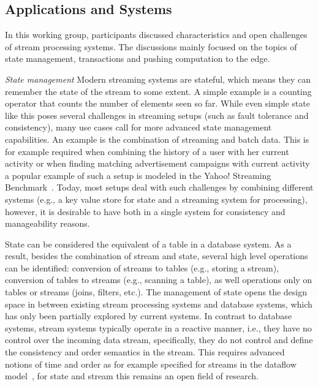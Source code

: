 \subsection{Applications and Systems}

In this working group, participants discussed characteristics and open
challenges of stream processing systems. The discussions mainly focused on
the topics of state management, transactions and pushing computation to the edge.

\emph{State management} Modern streaming systems are stateful, which means they can remember the state
of the stream to some extent. A simple example is a counting operator that
counts the number of elements seen so far. While even simple state like this
poses several challenges in streaming setups (such as fault tolerance and
consistency), many use cases call for more advanced state management
capabilities. An example is the combination of streaming and batch data. This
is for example required when combining the history of a user with her current
activity or when finding matching advertisement campaigns with current activity
a popular example of such a setup is modeled in the \textsf{Yahoo! Streaming
Benchmark}~\cite{Chintapalli2016BenchmarkingSC}. Today, most setups deal with
such challenges by combining different systems (e.g., a key value store for
state and a streaming system for processing), however, it is desirable to have
both in a single system for consistency and manageability reasons.

State can be considered the equivalent of a table in a database system. As a
result, besides the combination of stream and state, several high level
operations can be identified: conversion of streams to tables (e.g., storing
a stream), conversion of tables to streams (e.g., scanning a table), as well
operations only on tables or streams (joins, filters, etc.). The management of
state opens the design space in between existing stream processing systems and
database systems, which has only been partially explored by current systems.
In contrast to database systems, stream systems typically operate in a reactive
manner, i.e., they have no control over the incoming data stream, specifically,
they do not control and define the consistency and order semantics in the
stream. This requires advanced notions of time and order as for example
specified for streams in the dataflow model~\cite{akidau2015dataflow}, for state and stream
this remains an open field of research.


